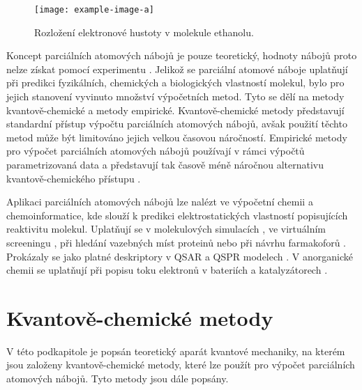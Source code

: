 \bigskip
\begin{figure}[h]
\begin{center}
\texttt{[image: example-image-a]}
\caption{Rozložení elektronové hustoty v molekule ethanolu.}
\end{center}
\end{figure}
Koncept parciálních atomových nábojů je pouze teoretický, hodnoty nábojů proto nelze získat pomocí experimentu \cite{Leach}. Jelikož se parciální atomové náboje uplatňují při predikci fyzikálních, chemických a biologických vlastností molekul, bylo pro jejich stanovení vyvinuto množství výpočetních metod. Tyto se dělí na metody kvantově-chemi\-cké a metody empirické. Kvantově-chemické metody představují standardní přístup výpočtu parciálních atomových nábojů,  avšak použití těchto metod může být limitováno jejich velkou časovou náročností. Empirické metody pro výpočet parciálních atomových nábojů používají v rámci výpočtů parametrizovaná data a představují tak časově méně náročnou alternativu kvantově-chemického přístupu \cite{Gasteiger:Textbook}. 

Aplikaci parciálních atomových nábojů lze nalézt ve výpočetní chemii a chemoinformatice, kde slouží k predikci elektrostatických vlastností popisujících reaktivitu molekul. Uplatňují se v molekulových simulacích \cite{molsimul}, ve virtuálním screeningu \cite{virtscreen}, při hledání vazebných míst proteinů nebo při návrhu farmakoforů \cite{farmak}. Prokázaly se jako platné deskriptory v QSAR a QSPR modelech \cite{Ghaf:QSAR, QSPR2}. V anorganické chemii se uplatňují při popisu toku elektronů v bateriích a katalyzátorech \cite{innorg}. 

\section{Kvantově-chemické metody}
V této podkapitole je popsán teoretický aparát kvantové mechaniky, na kterém jsou založeny kvantově-chemické metody, které lze použít pro výpočet parciálních atomových nábojů. Tyto metody jsou dále popsány. 

